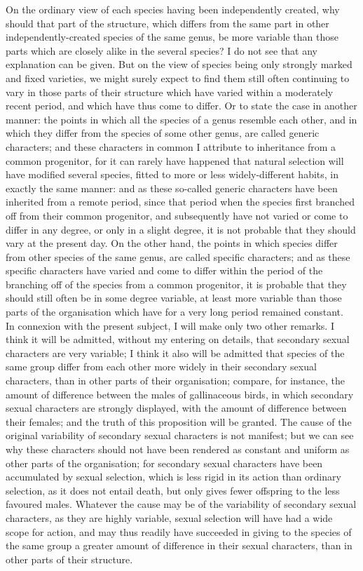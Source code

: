 \indent On the ordinary view of each species having been independently created, why should that part of the structure, which differs from the same part in other independently-created species of the same genus, be more variable than those parts which are closely alike in the several species? I do not see that any explanation can be given. But on the view of species being only strongly marked and fixed varieties, we might surely expect to find them still often continuing to vary in those parts of their structure which have varied within a moderately recent period, and which have thus come to differ. Or to state the case in another manner: the points in which all the species of a genus resemble each other, and in which they differ from the species of some other genus, are called generic characters; and these characters in common I attribute to inheritance from a common progenitor, for it can rarely have happened that natural selection will have modified several species, fitted to more or less widely-different habits, in exactly the same manner: and as these so-called generic characters have been inherited from a remote period, since that period when the species first branched off from their common progenitor, and subsequently have not varied or come to differ in any degree, or only in a slight degree, it is not probable that they should vary at the present day. On the other hand, the points in which species differ from other species of the same genus, are called specific characters; and as these specific characters have varied and come to differ within the period of the branching off of the species from a common progenitor, it is probable that they should still often be in some degree variable, at least more variable than those parts of the organisation which have for a very long period remained constant.\\
\indent In connexion with the present subject, I will make only two other remarks. I think it will be admitted, without my entering on details, that secondary sexual characters are very variable; I think it also will be admitted that species of the same group differ from each other more widely in their secondary sexual characters, than in other parts of their organisation; compare, for instance, the amount of difference between the males of gallinaceous birds, in which secondary sexual characters are strongly displayed, with the amount of difference between their females; and the truth of this proposition will be granted. The cause of the original variability of secondary sexual characters is not manifest; but we can see why these characters should not have been rendered as constant and uniform as other parts of the organisation; for secondary sexual characters have been accumulated by sexual selection, which is less rigid in its action than ordinary selection, as it does not entail death, but only gives fewer offspring to the less favoured males. Whatever the cause may be of the variability of secondary sexual characters, as they are highly variable, sexual selection will have had a wide scope for action, and may thus readily have succeeded in giving to the species of the same group a greater amount of difference in their sexual characters, than in other parts of their structure.\\
